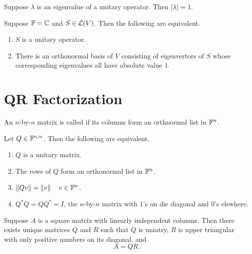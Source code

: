 \begin{thm}
  \label{thm: eigenvalues of unitary operators}
  Suppose $\lambda$ is an eigenvalue of a unitary operator. Then $|\lambda| = 1$.
\end{thm}

\begin{thm}
  \label{thm: description of unitary operators on complex inner product spaces}
  Suppose $\mathbb{F} = \mathbb{C}$ and $S \in \mathcal{L}(V)$. Then the following are equivalent.
  \begin{enumerate}[label=\textbf{(\alph*)}]
    \item $S$  is a unitary operator.
    \item There is an orthonormal basis of $V$ consisting of eigenvertors of $S$ whose corresponding eigenvalues all have absolute value $1$.
  \end{enumerate}
\end{thm}

\section{QR Factorization}
\begin{mydef}
  An $n$-by-$n$ matrix is called  if its columns form an orthnormal list in $\mathbb{F}^n$.
\end{mydef}

\begin{thm}
  Let $Q \in \mathbb{F}^{n,n}$. Then the following are equivalent.
  \begin{enumerate}[label=\textbf{(\alph*)}]
    \item $Q$ is a unitary matrix.
    \item The rows of $Q$ form an orthonormal list in $\mathbb{F}^{n}$.
    \item $\left \lVert Qv \right \rVert = \left \lVert v \right \rVert \quad v \in \mathbb{F}^n$.
    \item $Q^*Q=QQ^*=I$, the $n$-by-$n$ matrix with $1$'s on die diagonal and $0$'s elswhere.
  \end{enumerate}
\end{thm}

\begin{thm}[QR factorization]
  Suppose $A$ is a square matrix with linearly independent columns. Then there exists unique matrices $Q$ and $R$ such that $Q$ is uniatry, $R$ is upper triangular with only positive numbers on its diagonal, and
  \[
    A=QR.
  \]
\end{thm}


